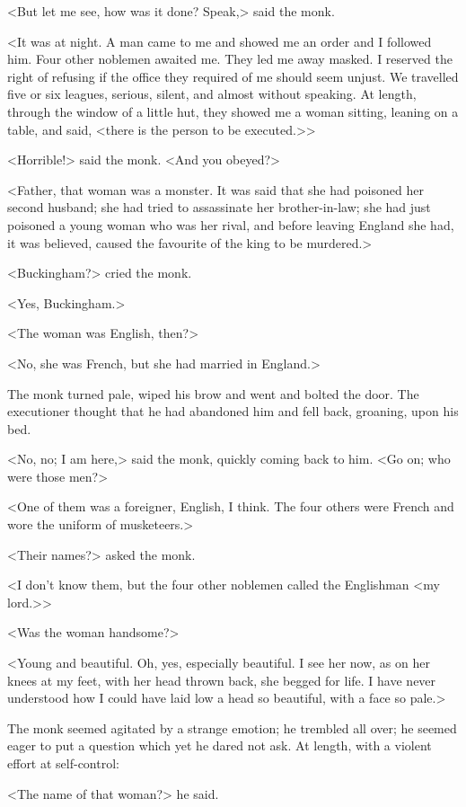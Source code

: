 <But let me see, how was it done? Speak,> said the monk.

<It was at night. A man came to me and showed me an order and I followed him. Four other noblemen awaited me. They led me away masked. I reserved the right of refusing if the office they required of me should seem unjust. We travelled five or six leagues, serious, silent, and almost without speaking. At length, through the window of a little hut, they showed me a woman sitting, leaning on a table, and said, <there is the person to be executed.>>

<Horrible!> said the monk. <And you obeyed?>

<Father, that woman was a monster. It was said that she had poisoned her second husband; she had tried to assassinate her brother-in-law; she had just poisoned a young woman who was her rival, and before leaving England she had, it was believed, caused the favourite of the king to be murdered.>

<Buckingham?> cried the monk.

<Yes, Buckingham.>

<The woman was English, then?>

<No, she was French, but she had married in England.>

The monk turned pale, wiped his brow and went and bolted the door. The executioner thought that he had abandoned him and fell back, groaning, upon his bed.

<No, no; I am here,> said the monk, quickly coming back to him. <Go on; who were those men?>

<One of them was a foreigner, English, I think. The four others were French and wore the uniform of musketeers.>

<Their names?> asked the monk.

<I don't know them, but the four other noblemen called the Englishman <my lord.>>

<Was the woman handsome?>

<Young and beautiful. Oh, yes, especially beautiful. I see her now, as on her knees at my feet, with her head thrown back, she begged for life. I have never understood how I could have laid low a head so beautiful, with a face so pale.>

The monk seemed agitated by a strange emotion; he trembled all over; he seemed eager to put a question which yet he dared not ask. At length, with a violent effort at self-control:

<The name of that woman?> he said.


